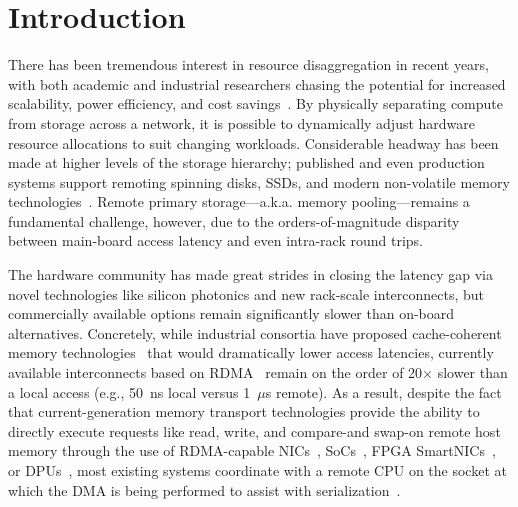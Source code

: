 \section{Introduction}

There has been tremendous interest in resource disaggregation in
recent years, with both academic and industrial researchers chasing
the potential for increased scalability, power efficiency, and cost
savings~\cite{blade-server,fastswap,rethinking,the-machine,requirements,clio-arxiv,firebox,leap,zombieland,storm,aifm,legoos,supernic}.
By physically separating compute from storage across a network, it is
possible to dynamically adjust hardware resource allocations to suit
changing workloads.  Considerable headway has been made at higher
levels of the storage hierarchy; published and even production systems
support remoting spinning disks, SSDs, and modern non-volatile
memory technologies~\cite{decible}.  Remote primary storage---a.k.a.
memory pooling---remains a fundamental challenge, however, due to the
orders-of-magnitude disparity between main-board access latency and
even intra-rack round trips.



The hardware community has made great strides in closing the latency
gap via novel technologies like silicon photonics and new rack-scale
interconnects, but commercially available options remain significantly
slower than on-board alternatives.  Concretely, while industrial consortia
have proposed cache-coherent memory technologies~\cite{genz,cxl} that
would dramatically lower access latencies, currently available
interconnects based on RDMA~\cite{infiniband-spec}
remain on the order of 20$\times$ slower than a local access (e.g.,
50~ns local versus 1~$\mu$s remote).  As a result, despite the fact
that current-generation memory transport technologies provide the
ability to directly execute requests like read, write, and compare-and
swap-on remote host memory through the use of RDMA-capable
NICs~\cite{connectx}, SoCs~\cite{cavium}, FPGA
SmartNICs~\cite{corundum,kv-direct}, or DPUs~\cite{fungible}, most
existing systems coordinate with a remote CPU on the socket at which
the DMA is being performed to assist with
serialization~\cite{cliquemap,erpc,herd,sonuma,storm}.


